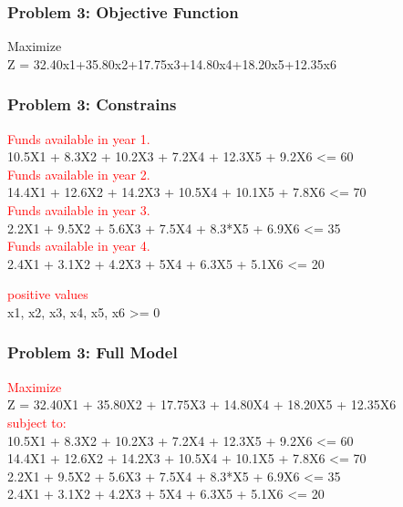 \documentclass[10pt,svgnames,fragile]{beamer}
\begin{document}
\begin{frame}[label={sec:orge9abdcb}]{}

\frametitle{Problem 3: Objective Function }
Maximize\\[1em]

Z =  32.40x1+35.80x2+17.75x3+14.80x4+18.20x5+12.35x6


\end{frame}

\begin{frame}[label={sec:orge9abdcb}]{}
\frametitle{Problem 3: Constrains }
\textcolor{red}{Funds available in year 1.}\\

10.5X1 + 8.3X2 + 10.2X3 + 7.2X4 + 12.3X5 + 9.2X6 <= 60\\

\textcolor{red}{Funds available in year 2.}\\

14.4X1 + 12.6X2 + 14.2X3 + 10.5X4 + 10.1X5 + 7.8X6 <= 70\\

\textcolor{red}{Funds available in year 3.}\\

2.2X1 + 9.5X2 + 5.6X3 + 7.5X4 + 8.3*X5 + 6.9X6 <= 35\\

\textcolor{red}{Funds available in year 4.}\\
2.4X1 + 3.1X2 + 4.2X3 + 5X4 + 6.3X5 + 5.1X6 <= 20


\textcolor{red}{positive values}\\
x1, x2, x3, x4, x5, x6 >= 0




\end{frame}

\begin{frame}[label={sec:orge9abdcb}]{}
\frametitle{Problem 3: Full Model }
\textcolor{red}{Maximize}\\[1em]
Z = 32.40X1 + 35.80X2 + 17.75X3 + 14.80X4 + 18.20X5 + 12.35X6\\[1em]
\textcolor{red}{subject to:}\\[1em]

10.5X1 + 8.3X2 + 10.2X3 + 7.2X4 + 12.3X5 + 9.2X6 <= 60\\
14.4X1 + 12.6X2 + 14.2X3 + 10.5X4 + 10.1X5 + 7.8X6 <= 70\\
2.2X1 + 9.5X2 + 5.6X3 + 7.5X4 + 8.3*X5 + 6.9X6 <= 35\\
2.4X1 + 3.1X2 + 4.2X3 + 5X4 + 6.3X5 + 5.1X6 <= 20
\end{frame}
\end{document}
